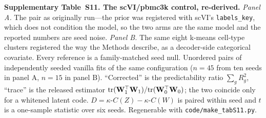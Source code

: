 \documentclass[11pt,a4paper]{article}
\begin{document}
\begin{table}[ht]
\centering
\caption*{\textbf{Supplementary Table~S11. The scVI/pbmc3k control, re-derived.} \emph{Panel A.} The pair as originally run---the prior was registered with scVI's \texttt{labels\_key}, which does not condition the model, so the two arms are the same model and the reported numbers are seed noise. \emph{Panel B.} The same eight k-means cell-type clusters registered the way the Methods describe, as a decoder-side categorical covariate. Every reference is a family-matched seed null. Unordered pairs of independently seeded vanilla fits of the same configuration ($n=45$ from ten seeds in panel A, $n=15$ in panel B). ``Corrected'' is the predictability ratio $\sum_g R^2_g$, ``trace'' is the released estimator $\mathrm{tr}(\Wmat_1^\top\Wmat_1)/\mathrm{tr}(\Wmat_0^\top\Wmat_0)$; the two coincide only for a whitened latent code. $D=\kappa$-$C(Z)-\kappa$-$C(W)$ is paired within seed and $t$ is a one-sample statistic over six seeds. Regenerable with \texttt{code/make\_tabS11.py}.}
\label{tab:scvi}
\small
\setlength{\tabcolsep}{4pt}

\end{table}
\end{document}

